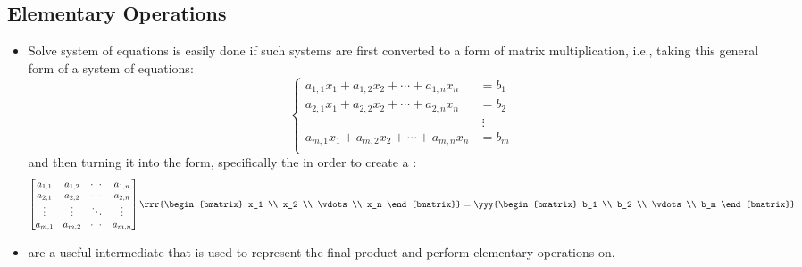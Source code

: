 \begin{itemize}
  \subsection{Elementary Operations}\label{Elementary Operations}
  \begin{itemize}
    \item Solve system of equations is easily done if such systems are first converted to a form of matrix multiplication, i.e., taking this general form of a system of equations:
    \[%
    \begin{cases}
      a_{1,1}x_{1}+a_{1,2}x_{2}+\cdots +a_{1,n}x_{n}&=b_1 \\ 
      a_{2,1}x_{1}+a_{2,2}x_{2}+\cdots +a_{2,n}x_{n}&=b_2 \\ 
      &~\vdots \\ 
      a_{m,1}x_{1}+a_{m,2}x_{2}+\cdots +a_{m,n}x_{n}&=b_m \\ 
    \end{cases}
    \]%
    and then turning it into the \hyperref[Matrix Vector Multiplication]{} form, specifically the  in order to create a :
    \[%
    \begin{bmatrix}
    a_{1,1} & a_{1,2} & \cdots & a_{1,n} \\
    a_{2,1} & a_{2,2} & \cdots & a_{2,n} \\
    \vdots & \vdots & \ddots & \vdots \\
    a_{m,1} & a_{m,2} & \cdots & a_{m,n}
    \end{bmatrix}
    \rrr{\begin{bmatrix} x_1 \\ x_2 \\ \vdots \\ x_n \end{bmatrix}}
    =
    \yyy{\begin{bmatrix} b_1 \\ b_2 \\ \vdots \\ b_m \end{bmatrix}}
    \]%
    \item \hyperref[Augmented and Complex Matrices]{} are a useful intermediate that is used to represent the final product and perform elementary operations on.
      \begin{itemize}

\end{itemize}
\end{itemize}
\end{itemize}
